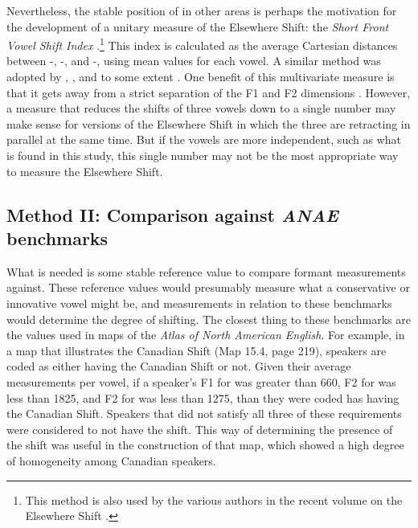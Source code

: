Nevertheless, the stable position of \fleece in other areas is perhaps the motivation for the development of a unitary measure of the Elsewhere Shift: the \textit{Short Front Vowel Shift Index} \citep{boberg_2019}.\footnote{This method is also used by the various authors in the recent volume on the Elsewhere Shift \citep{becker_2019_pads}.} This index is calculated as the average Cartesian distances between \fleece-\kit, \fleece-\dress, and \fleece-\trap, using mean values for each vowel. A similar method was adopted by \citet{holland_2019}, \citet{pratt_donofrio_2017}, and to some extent \citet{podesva_etal_2015}. One benefit of this multivariate measure is that it gets away from a strict separation of the F1 and F2 dimensions \citep{becker_2019_pads}. However, a measure that reduces the shifts of three vowels down to a single number may make sense for versions of the Elsewhere Shift in which the three are retracting in parallel at the same time. But if the vowels are more independent, such as what is found in this study, this single number may not be the most appropriate way to measure the Elsewhere Shift.


\subsection{Method II: Comparison against \textit{ANAE} benchmarks}

What is needed is some stable reference value to compare formant measurements against. These reference values would presumably measure what a conservative or innovative vowel might be, and measurements in relation to these benchmarks would determine the degree of shifting. The closest thing to these benchmarks are the values used in maps of the \textit{Atlas of North American English}. For example, in a map that illustrates the Canadian Shift (Map 15.4, page 219), speakers are coded as either having the Canadian Shift or not. Given their average measurements per vowel, if a speaker’s F1 for \dress was greater than 660, F2 for \trap was less than 1825, and F2 for \lot was less than 1275, than they were coded has having the Canadian Shift. Speakers that did not satisfy all three of these requirements were considered to not have the shift. This way of determining the presence of the shift was useful in the construction of that map, which showed a high degree of homogeneity among Canadian speakers.

